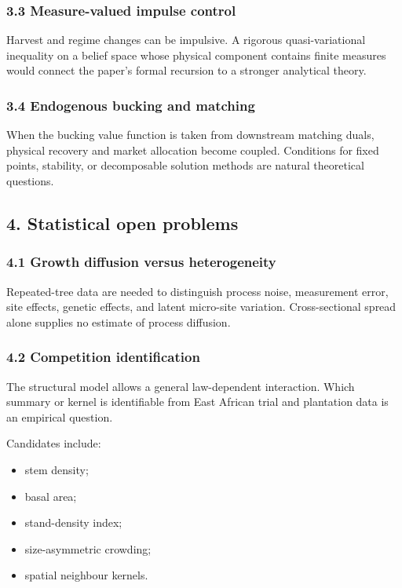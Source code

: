 \subsubsection{3.3 Measure-valued impulse control}\label{measure-valued-impulse-control}

Harvest and regime changes can be impulsive. A rigorous quasi-variational
inequality on a belief space whose physical component contains finite measures
would connect the paper's formal recursion to a stronger analytical theory.

\subsubsection{3.4 Endogenous bucking and matching}\label{endogenous-bucking-and-matching}

When the bucking value function is taken from downstream matching duals, physical
recovery and market allocation become coupled. Conditions for fixed points,
stability, or decomposable solution methods are natural theoretical questions.

\subsection{4. Statistical open problems}\label{statistical-open-problems}

\subsubsection{4.1 Growth diffusion versus heterogeneity}\label{growth-diffusion-versus-heterogeneity}

Repeated-tree data are needed to distinguish process noise, measurement error,
site effects, genetic effects, and latent micro-site variation. Cross-sectional
spread alone supplies no estimate of process diffusion.

\subsubsection{4.2 Competition identification}\label{competition-identification}

The structural model allows a general law-dependent interaction. Which summary
or kernel is identifiable from East African trial and plantation data is an
empirical question.

Candidates include:

\begin{itemize}
\tightlist
\item
  stem density;
\item
  basal area;
\item
  stand-density index;
\item
  size-asymmetric crowding;
\item
  spatial neighbour kernels.
\end{itemize}

